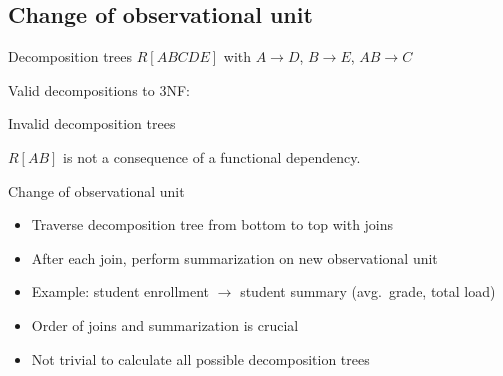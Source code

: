 \subsection{Change of observational unit}

\begin{frame}{Decomposition trees}
  $R[ABCDE]$ with $A \to D$, $B \to E$, $AB \to C$

  \vspace{0.3cm}
  \centering
  Valid decompositions to 3NF:

  \vspace{0.3cm}
\end{frame}

\begin{frame}{Invalid decomposition trees}
  \centering

  \vspace{0.3cm}
  \small $R[AB]$ is not a consequence of a functional dependency.
\end{frame}

\begin{frame}{Change of observational unit}
  \begin{itemize}
    \item Traverse decomposition tree from bottom to top with joins
    \item After each join, perform summarization on new observational unit
    \item Example: student enrollment $\to$ student summary (avg.\ grade, total load)
    \item Order of joins and summarization is crucial
    \item Not trivial to calculate all possible decomposition trees
  \end{itemize}
\end{frame}

